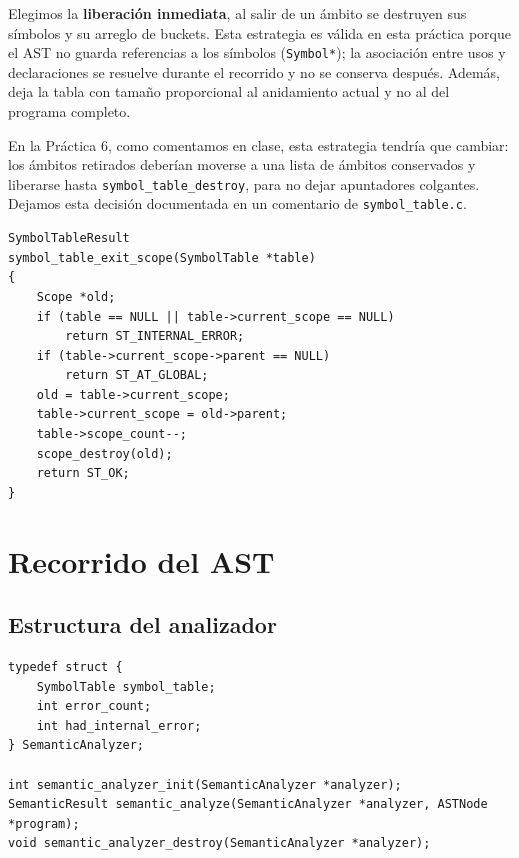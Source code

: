 \documentclass[12pt,letterpaper]{article}
\begin{document}
Elegimos la \textbf{liberación inmediata}, al salir de un ámbito se destruyen sus símbolos y su arreglo de
buckets. Esta estrategia es válida en esta práctica porque el AST no guarda referencias a los símbolos
(\texttt{Symbol*}); la asociación entre usos y declaraciones se resuelve durante el recorrido y no se
conserva después. Además, deja la tabla con tamaño proporcional al anidamiento actual y no al del programa
completo.

En la Práctica 6, como comentamos en clase, esta estrategia tendría que cambiar: los ámbitos retirados deberían
moverse a una lista de ámbitos conservados y liberarse hasta \texttt{symbol\_table\_destroy}, para no dejar
apuntadores colgantes. Dejamos esta decisión documentada en un comentario de \texttt{symbol\_table.c}.

\begin{lstlisting}[style=modernc, caption={Salida de un ámbito.}]
SymbolTableResult
symbol_table_exit_scope(SymbolTable *table)
{
    Scope *old;
    if (table == NULL || table->current_scope == NULL)
        return ST_INTERNAL_ERROR;
    if (table->current_scope->parent == NULL)
        return ST_AT_GLOBAL;
    old = table->current_scope;
    table->current_scope = old->parent;
    table->scope_count--;
    scope_destroy(old);
    return ST_OK;
}
\end{lstlisting}

\section*{Recorrido del AST}

\subsection*{Estructura del analizador}

\begin{lstlisting}[style=modernc, caption={Estructura \texttt{SemanticAnalyzer} de \texttt{semantic.h}.}]
typedef struct {
    SymbolTable symbol_table;
    int error_count;
    int had_internal_error;
} SemanticAnalyzer;

int semantic_analyzer_init(SemanticAnalyzer *analyzer);
SemanticResult semantic_analyze(SemanticAnalyzer *analyzer, ASTNode *program);
void semantic_analyzer_destroy(SemanticAnalyzer *analyzer);
\end{lstlisting}
\end{document}
